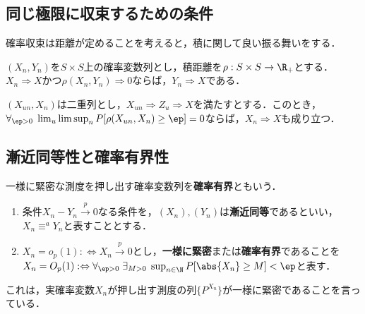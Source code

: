 \documentclass[uplatex,dvipdfmx]{jsreport}
\begin{document}
\subsection{同じ極限に収束するための条件}

\begin{tcolorbox}[colframe=ForestGreen, colback=ForestGreen!10!white,breakable,colbacktitle=ForestGreen!40!white,coltitle=black,fonttitle=\bfseries\sffamily,
title=]
    確率収束は距離が定めることを考えると，積に関して良い振る舞いをする．
\end{tcolorbox}

\begin{proposition}[確率収束の遺伝]
    $(X_n,Y_n)$を$S\times S$上の確率変数列とし，積距離を$\rho:S\times S\to\R_+$とする．
    $X_n\Rightarrow X$かつ$\rho(X_n,Y_n)\Rightarrow0$ならば，$Y_n\Rightarrow X$である．
\end{proposition}

\begin{theorem}
    $(X_{un},X_n)$は二重列とし，$X_{un}\Rightarrow Z_u\Rightarrow X$を満たすとする．このとき，
    $\forall_{\ep>0}\;\lim_u\limsup_nP[\rho(X_{un},X_n)\ge\ep]=0$ならば，$X_n\Rightarrow X$も成り立つ．
\end{theorem}

\subsection{漸近同等性と確率有界性}

\begin{tcolorbox}[colframe=ForestGreen, colback=ForestGreen!10!white,breakable,colbacktitle=ForestGreen!40!white,coltitle=black,fonttitle=\bfseries\sffamily,
title=]
    一様に緊密な測度を押し出す確率変数列を\textbf{確率有界}ともいう．
    
\end{tcolorbox}

\begin{definition}\mbox{}
    \begin{enumerate}
        \item 条件$X_n-Y_n\xrightarrow{p}0$なる条件を，$(X_n),(Y_n)$は\textbf{漸近同等}であるといい，$X_n\equiv^aY_n$と表すこととする．
        \item $X_n=o_p(1):\Leftrightarrow X_n\xrightarrow{p}0$とし，\textbf{一様に緊密}または\textbf{確率有界}であることを$X_n=O_p(1):\Leftrightarrow\forall_{\ep>0}\;\exists_{M>0}\;\sup_{n\in\N}P[\abs{X_n}\ge M]<\ep$と表す．
    \end{enumerate}
\end{definition}
\begin{remarks}
    これは，実確率変数$X_n$が押し出す測度の列$\{P^{X_n}\}$が一様に緊密であることを言っている．
\end{remarks}
\end{document}
